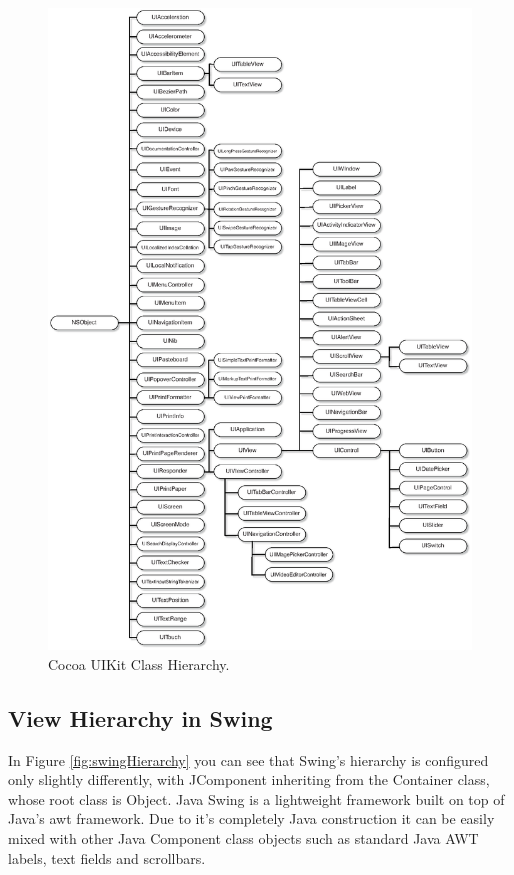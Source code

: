 \documentclass[a4paper,14pt]{article}
\begin{document}
\begin{figure}[H]
\centering
\includegraphics[scale=0.80]{UIKitClassHierarchy.eps}
\caption{Cocoa UIKit Class Hierarchy. \protect{} }
\label{fig:cocoaHierarchy}
\end{figure}

\subsection{View Hierarchy in Swing} %
\label{sub:view_hierarchy_in_swing}
In Figure \ref{fig:swingHierarchy} you can see that Swing's hierarchy is configured only slightly differently, with JComponent inheriting from the Container class, whose root class is Object. Java Swing is a lightweight framework built on top of Java's awt framework. Due to it's completely Java construction it can be easily mixed with other Java Component class objects such as standard Java AWT labels, text fields and scrollbars.
\end{document}
